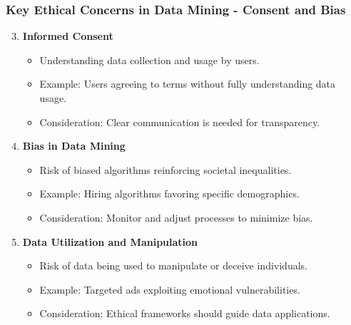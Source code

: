 \documentclass[aspectratio=169]{beamer}
\begin{document}
\begin{frame}[fragile]
    \frametitle{Key Ethical Concerns in Data Mining - Consent and Bias}
    \begin{enumerate}
        \setcounter{enumi}{2} %
        \item \textbf{Informed Consent}
        \begin{itemize}
            \item Understanding data collection and usage by users.
            \item Example: Users agreeing to terms without fully understanding data usage.
            \item Consideration: Clear communication is needed for transparency.
        \end{itemize}

        \item \textbf{Bias in Data Mining}
        \begin{itemize}
            \item Risk of biased algorithms reinforcing societal inequalities.
            \item Example: Hiring algorithms favoring specific demographics.
            \item Consideration: Monitor and adjust processes to minimize bias.
        \end{itemize}
        
        \item \textbf{Data Utilization and Manipulation}
        \begin{itemize}
            \item Risk of data being used to manipulate or deceive individuals.
            \item Example: Targeted ads exploiting emotional vulnerabilities.
            \item Consideration: Ethical frameworks should guide data applications.
        \end{itemize}
    \end{enumerate}
\end{frame}
\end{document}
